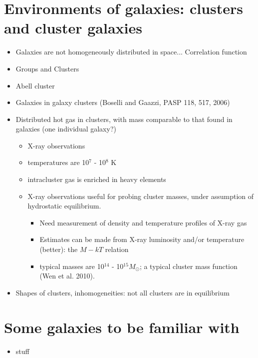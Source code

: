 \documentclass[12pt]{article}
\begin{document}
\section{Environments of galaxies: clusters and cluster galaxies}
    \begin{itemize}
      \item Galaxies are not homogeneously distributed in space...
      Correlation function
      \item Groups and Clusters
      \item Abell cluster
      \item Galaxies in galaxy clusters (Boselli and Gaazzi, PASP 118,
      517, 2006)
      \item Distributed hot gas in clusters, with mass comparable to
      that found in galaxies (one individual galaxy?)
      \begin{itemize}
        \item X-ray observations
        \item temperatures are 10$^7$ - 10$^8$ K
        \item intracluster gas is enriched in heavy elements
        \item X-ray observations useful for probing cluster masses,
        under assumption of hydrostatic equilibrium.
        \begin{itemize}
          \item Need measurement of density and temperature profiles
          of X-ray gas
          \item Estimates can be made from X-ray luminosity and/or
          temperature (better): the $M - kT$ relation
          \item typical masses are 10$^{14}$ - 10$^{15} M_{\odot}$; a
          typical cluster mass function (Wen et al. 2010).
        \end{itemize}
      \end{itemize}
      \item Shapes of clusters, inhomogeneities: not all clusters are
      in equilibrium
    \end{itemize}

\section{Some galaxies to be familiar with}
    \begin{itemize}
      \item stuff
    \end{itemize}
\end{document}
